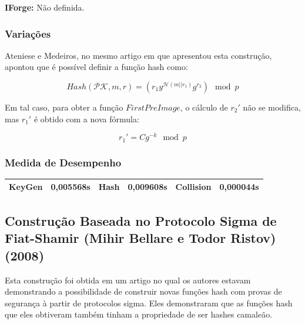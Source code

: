 \documentclass[a4paper]{article}
\begin{document}
\textbf{IForge: }Não definida.

%




\subsubsection{Variações}

Ateniese e Medeiros, no mesmo artigo em que apresentou esta construção,
apontou que é possível definir a função hash como:

$$ Hash(\mathcal{PK}, m, r) =
\left(r_1y^{\mathcal{H}(m||r_1)}g^{r_2} \right)\mod p
$$

Em tal caso, para obter a função $FirstPreImage$, o cálculo de $r_2'$
não se modifica, mas $r_1'$ é obtido com a nova fórmula:

$$
r_1'=Cg^{-k} \mod p
$$

\subsubsection{Medida de Desempenho}

\begin{center}
\begin{tabular}{|c|c|c|c|c|c|}
  \hline
  KeyGen & 0,005568s & Hash & 0,009608s & Collision & 0,000044s\\
  \hline
\end{tabular}
\end{center}

\subsection{Construção Baseada no Protocolo Sigma de Fiat-Shamir
  (Mihir Bellare e Todor Ristov) (2008)\cite{sigma}}

Esta construção foi obtida em um artigo no qual os autores estavam
demonstrando a possibilidade de construir novas funções hash com
provas de segurança à partir de protocolos sigma. Eles demonstraram
que as funções hash que eles obtiveram também tinham a propriedade de
ser hashes camaleão.
\end{document}
